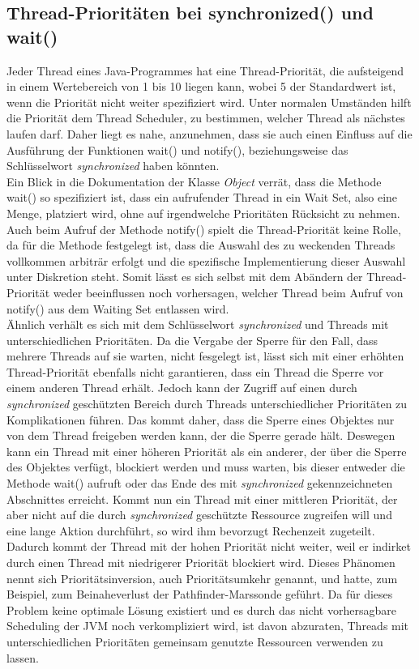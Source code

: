\documentclass[12pt, onecolumn,notitlepage]{scrartcl}
\begin{document}
\subsection{Thread-Prioritäten bei synchronized() und wait()}
Jeder Thread eines Java-Programmes hat eine Thread-Priorität, die aufsteigend in einem Wertebereich von 1 bis 10 liegen kann, wobei 5 der Standardwert ist, wenn die Priorität nicht weiter spezifiziert wird. Unter normalen Umständen hilft die Priorität dem Thread Scheduler, zu bestimmen, welcher Thread als nächstes laufen darf. Daher liegt es nahe, anzunehmen, dass sie auch einen Einfluss auf die Ausführung der Funktionen wait() und notify(), beziehungsweise das Schlüsselwort \textit{synchronized} haben könnten. \\
Ein Blick in die Dokumentation der Klasse \textit{Object} verrät, dass die Methode wait() so spezifiziert ist, dass ein aufrufender Thread in ein Wait Set, also eine Menge, platziert wird, ohne auf irgendwelche Prioritäten Rücksicht zu nehmen. Auch beim Aufruf der Methode notify() spielt die Thread-Priorität keine Rolle, da für die Methode festgelegt ist, dass die Auswahl des zu weckenden Threads vollkommen arbiträr erfolgt und die spezifische Implementierung dieser Auswahl unter Diskretion steht.\cite{object} Somit lässt es sich selbst mit dem Abändern der Thread-Priorität weder beeinflussen noch vorhersagen, welcher Thread beim Aufruf von notify() aus dem Waiting Set entlassen wird. \\
Ähnlich verhält es sich mit dem Schlüsselwort \textit{synchronized} und Threads mit unterschiedlichen Prioritäten. Da die Vergabe der Sperre für den Fall, dass mehrere Threads auf sie warten, nicht fesgelegt ist, lässt sich mit einer erhöhten Thread-Priorität ebenfalls nicht garantieren, dass ein Thread die Sperre vor einem anderen Thread erhält. Jedoch kann der Zugriff auf einen durch \textit{synchronized} geschützten Bereich durch Threads unterschiedlicher Prioritäten zu Komplikationen führen. Das kommt daher, dass die Sperre eines Objektes nur von dem Thread freigeben werden kann, der die Sperre gerade hält. Deswegen kann ein Thread mit einer höheren Priorität als ein anderer, der über die Sperre des Objektes verfügt, blockiert werden und muss warten, bis dieser entweder die Methode wait() aufruft oder das Ende des mit \textit{synchronized} gekennzeichneten Abschnittes erreicht. Kommt nun ein Thread mit einer mittleren Priorität, der aber nicht auf die durch \textit{synchronized} geschützte Ressource zugreifen will und eine lange Aktion durchführt, so wird ihm bevorzugt Rechenzeit zugeteilt. Dadurch kommt der Thread mit der hohen Priorität nicht weiter, weil er indirket durch einen Thread mit niedrigerer Priorität blockiert wird. Dieses Phänomen nennt sich Prioritätsinversion, auch Prioritätsumkehr genannt, und hatte, zum Beispiel, zum Beinaheverlust der Pathfinder-Marssonde geführt. Da für dieses Problem keine optimale Lösung existiert und es durch das nicht vorhersagbare Scheduling der JVM noch verkompliziert wird, ist davon abzuraten, Threads mit unterschiedlichen Prioritäten gemeinsam genutzte Ressourcen verwenden zu lassen.\cite{joerg}
\end{document}
